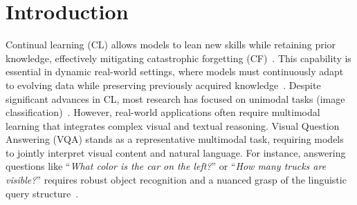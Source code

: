 \section{Introduction}
\label{sec:introduction}
Continual learning (CL) allows models to lean new skills while retaining prior knowledge, effectively mitigating catastrophic forgetting (CF)~\citep{mcclelland1995there, mccloskey1989catastrophic}. This capability is essential in dynamic real-world settings, where models must continuously adapt to evolving data while preserving previously acquired knowledge~\citep{zhang2023vqacl}. Despite significant advances in CL, most research has focused on unimodal tasks (\eg image classification)~\citep{wang2022dualprompt, wang2022continual, kirkpatrick2017overcoming, NEURIPS2023_15294ba2, marouf2024weightedensemblemodelsstrong, zhou2024expandable}.
However, real-world applications often require multimodal learning that integrates complex visual and textual reasoning. Visual Question Answering (VQA) stands as a representative multimodal task, requiring models to jointly interpret visual content and natural language. For instance, answering questions like ``\textit{What color is the car on the left?}'' or ``\textit{How many trucks are visible?}'' requires robust object recognition and a nuanced grasp of the linguistic query structure~\citep{zhang2023vqacl, schwenk2022okvqa, yang2022zero, cheng2023vindlu, Wang_2023_ICCV}.


